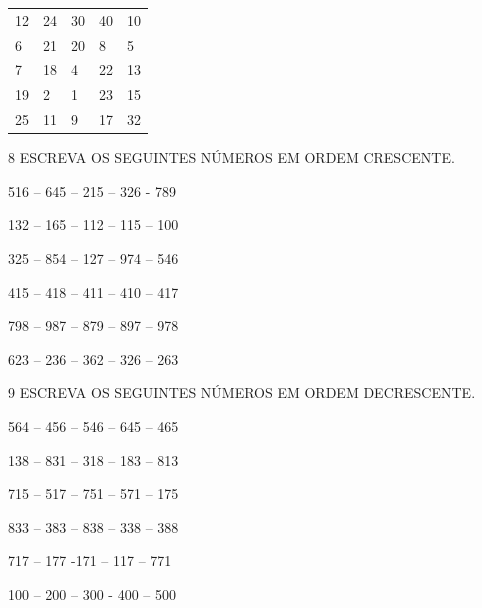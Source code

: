 \begin{longtable}[]{@{}lllll@{}}
\toprule
12 & 24 & 30 & 40 & 10\tabularnewline
6 & 21 & 20 & 8 & 5\tabularnewline
7 & 18 & 4 & 22 & 13\tabularnewline
19 & 2 & 1 & 23 & 15\tabularnewline
25 & 11 & 9 & 17 & 32\tabularnewline
\bottomrule
\end{longtable}


\num{8} ESCREVA OS SEGUINTES NÚMEROS EM ORDEM CRESCENTE.

\begin{escolha}
\item 516 -- 645 -- 215 -- 326 - 789



\item 132 -- 165 -- 112 -- 115 -- 100



\item 325 -- 854 -- 127 -- 974 -- 546



\item 415 -- 418 -- 411 -- 410 -- 417



\item 798 -- 987 -- 879 -- 897 -- 978



\item 623 -- 236 -- 362 -- 326 -- 263

\end{escolha}

\num{9} ESCREVA OS SEGUINTES NÚMEROS EM ORDEM DECRESCENTE.

\begin{escolha}
\item 564 -- 456 -- 546 -- 645 -- 465


\item 138 -- 831 -- 318 -- 183 -- 813


\item 715 -- 517 -- 751 -- 571 -- 175


\item 833 -- 383 -- 838 -- 338 -- 388


\item 717 -- 177 -171 -- 117 -- 771


\item 100 -- 200 -- 300 - 400 -- 500

\end{escolha}

